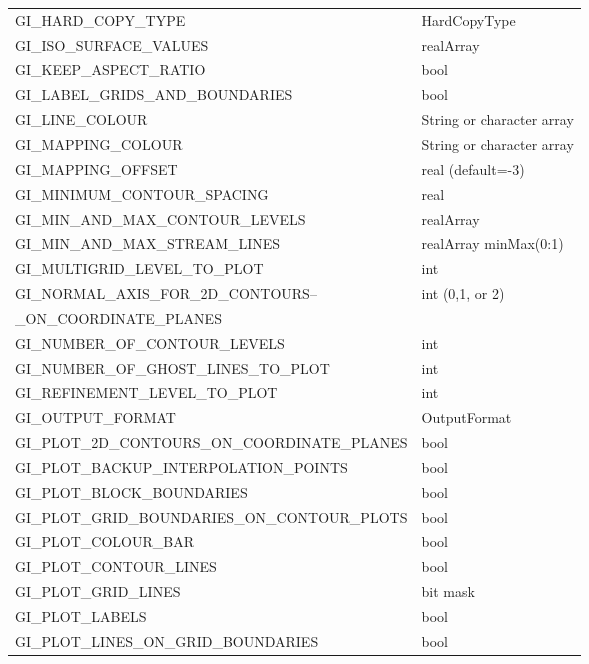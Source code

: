 \documentclass{article}
\begin{document}
\begin{supertabular}{|l|l|}
 GI\_HARD\_COPY\_TYPE                       &  HardCopyType \\
 GI\_ISO\_SURFACE\_VALUES                   &  realArray \\
 GI\_KEEP\_ASPECT\_RATIO                    & bool \\
 GI\_LABEL\_GRIDS\_AND\_BOUNDARIES               &  bool \\
 GI\_LINE\_COLOUR                           &  String or character array   \\
 GI\_MAPPING\_COLOUR                        &  String or character array   \\
 GI\_MAPPING\_OFFSET                        &  real (default=-3)\\
 GI\_MINIMUM\_CONTOUR\_SPACING              &  real \\
 GI\_MIN\_AND\_MAX\_CONTOUR\_LEVELS         &  realArray \\
 GI\_MIN\_AND\_MAX\_STREAM\_LINES           &  realArray minMax(0:1) \\
 GI\_MULTIGRID\_LEVEL\_TO\_PLOT             & int \\ 
 GI\_NORMAL\_AXIS\_FOR\_2D\_CONTOURS--      & int (0,1, or 2) \\
 \hspace{4cm}\_ON\_COORDINATE\_PLANES            & \\
 GI\_NUMBER\_OF\_CONTOUR\_LEVELS            &  int    \\
 GI\_NUMBER\_OF\_GHOST\_LINES\_TO\_PLOT     &  int \\
 GI\_REFINEMENT\_LEVEL\_TO\_PLOT            & int \\ 
 GI\_OUTPUT\_FORMAT                         & OutputFormat \\
 GI\_PLOT\_2D\_CONTOURS\_ON\_COORDINATE\_PLANES  & bool \\
 GI\_PLOT\_BACKUP\_INTERPOLATION\_POINTS         & bool \\
 GI\_PLOT\_BLOCK\_BOUNDARIES                     & bool \\
 GI\_PLOT\_GRID\_BOUNDARIES\_ON\_CONTOUR\_PLOTS  & bool \\
 GI\_PLOT\_COLOUR\_BAR                           &  bool  \\
 GI\_PLOT\_CONTOUR\_LINES                        &  bool  \\
 GI\_PLOT\_GRID\_LINES                           & bit mask \\
 GI\_PLOT\_LABELS                                & bool \\
 GI\_PLOT\_LINES\_ON\_GRID\_BOUNDARIES           & bool \\

\end{supertabular}
\end{document}
